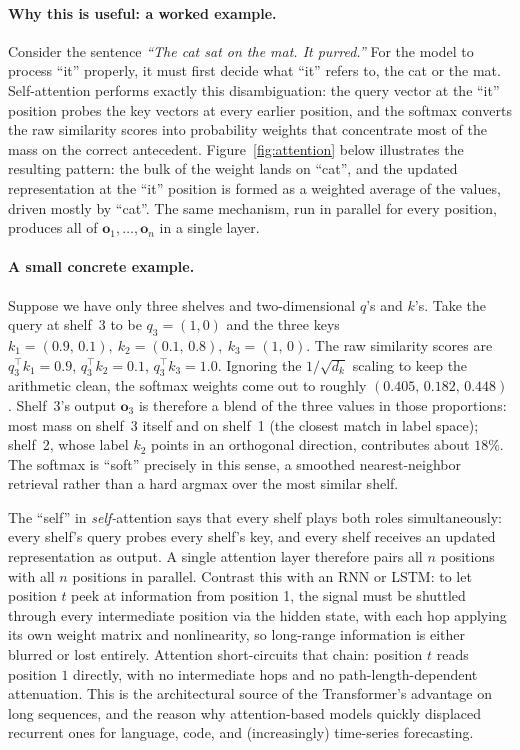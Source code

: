 \documentclass[11pt,a4paper]{report}
\begin{document}
\paragraph{Why this is useful: a worked example.}  Consider the sentence \emph{``The cat sat on the mat.  It purred.''}  For the model to process ``it'' properly, it must first decide what ``it'' refers to, the cat or the mat.  Self-attention performs exactly this disambiguation: the query vector at the ``it'' position probes the key vectors at every earlier position, and the softmax converts the raw similarity scores into probability weights that concentrate most of the mass on the correct antecedent.  Figure~\ref{fig:attention} below illustrates the resulting pattern: the bulk of the weight lands on ``cat'', and the updated representation at the ``it'' position is formed as a weighted average of the values, driven mostly by ``cat''.  The same mechanism, run in parallel for every position, produces all of $\bm{o}_1,\dots,\bm{o}_n$ in a single layer.

\paragraph{A small concrete example.}  Suppose we have only three shelves and two-dimensional $q$'s and $k$'s.  Take the query at shelf~3 to be $q_3 = (1,0)$ and the three keys
$k_1 = (0.9,\,0.1),\ k_2 = (0.1,\,0.8),\ k_3 = (1,\,0).$
The raw similarity scores are $q_3^{\!\top}k_1 = 0.9$, $q_3^{\!\top}k_2 = 0.1$, $q_3^{\!\top}k_3 = 1.0$.  Ignoring the $1/\sqrt{d_k}$ scaling to keep the arithmetic clean, the softmax weights come out to roughly $(0.405,\,0.182,\,0.448)$.  Shelf~3's output $\bm{o}_3$ is therefore a blend of the three values in those proportions: most mass on shelf~3 itself and on shelf~1 (the closest match in label space); shelf~2, whose label $k_2$ points in an orthogonal direction, contributes about $18\%$.  The softmax is ``soft'' precisely in this sense, a smoothed nearest-neighbor retrieval rather than a hard argmax over the most similar shelf.

The ``self'' in \emph{self-}attention says that every shelf plays both roles simultaneously: every shelf's query probes every shelf's key, and every shelf receives an updated representation as output.  A single attention layer therefore pairs all $n$ positions with all $n$ positions in parallel.  Contrast this with an RNN or LSTM: to let position $t$ peek at information from position 1, the signal must be shuttled through every intermediate position via the hidden state, with each hop applying its own weight matrix and nonlinearity, so long-range information is either blurred or lost entirely.  Attention short-circuits that chain: position $t$ reads position $1$ directly, with no intermediate hops and no path-length-dependent attenuation.  This is the architectural source of the Transformer's advantage on long sequences, and the reason why attention-based models quickly displaced recurrent ones for language, code, and (increasingly) time-series forecasting.
\end{document}
